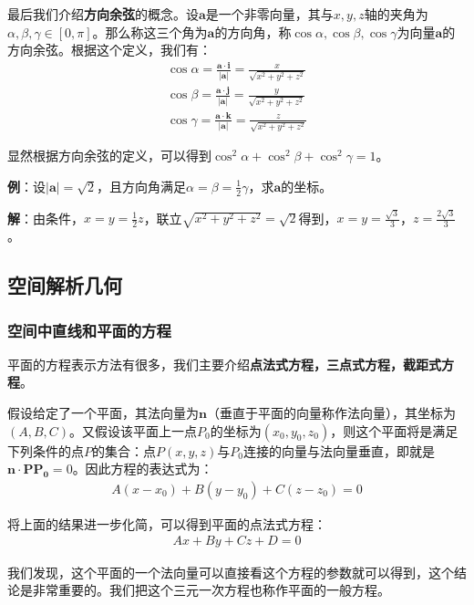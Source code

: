 \documentclass{ctexart}
\let\oldtextbf\textbf %
\renewcommand{\textbf}[1]{\textcolor{btex}{\oldtextbf{#1}}} %
\begin{document}
最后我们介绍\textbf{方向余弦}的概念。设$\bm{a}$是一个非零向量，其与$x,y,z$轴的夹角为$\alpha,\beta,\gamma\in[0,\pi]$。那么称这三个角为$\bm{a}$的方向角，称$\cos\alpha,\cos\beta,\cos\gamma$为向量$\bm{a}$的方向余弦。根据这个定义，我们有：
\begin{align*}
    \cos\alpha=\frac{\bm{a}\cdot\bm{i}}{|\bm{a}|}=\frac{x}{\sqrt{x^2+y^2+z^2}}\\
\cos\beta=\frac{\bm{a}\cdot\bm{j}}{|\bm{a}|}=\frac{y}{\sqrt{x^2+y^2+z^2}}\\
\cos\gamma=\frac{\bm{a}\cdot\bm{k}}{|\bm{a}|}=\frac{z}{\sqrt{x^2+y^2+z^2}}\tag{6-7} 
\end{align*}

显然根据方向余弦的定义，可以得到$\cos^2\alpha+\cos^2\beta+\cos^2\gamma=1$。

\textbf{例}：设$|\bm{a}|=\sqrt{2}$，且方向角满足$\alpha=\beta=\frac{1}{2}\gamma$，求$\bm{a}$的坐标。

\textbf{解}：由条件，$x=y=\frac{1}{2}z$，联立$\sqrt{x^2+y^2+z^2}=\sqrt{2}$得到，$x=y=\frac{\sqrt{3}}{3}$，$z=\frac{2\sqrt{3}}{3}$。

\subsection{空间解析几何}
\subsubsection{空间中直线和平面的方程}
平面的方程表示方法有很多，我们主要介绍\textbf{点法式方程，三点式方程，截距式方程}。

假设给定了一个平面，其法向量为$\bm{n}$（垂直于平面的向量称作法向量），其坐标为$(A,B,C)$。又假设该平面上一点$P_0$的坐标为$(x_0,y_0,z_0)$，则这个平面将是满足下列条件的点$P$的集合：点$P(x,y,z)$与$P_0$连接的向量与法向量垂直，即就是$\bm{n}\cdot\bm{PP_0}=0$。因此方程的表达式为：
\begin{align*}
    A(x-x_0)+B(y-y_0)+C(z-z_0)=0
\end{align*}
\begin{tcolorbox}[
    colback=bac1,     %
    colframe=fra1,   %
    coltitle=white,             %
    coltext=tex1,
    title=平面的点法式方程,
    fonttitle=\bfseries,        %
arc=3mm,                     %
breakable
]
将上面的结果进一步化简，可以得到平面的点法式方程：
\begin{align*}
    Ax+By+Cz+D=0\tag{6-8}
\end{align*}

我们发现，这个平面的一个法向量可以直接看这个方程的参数就可以得到，这个结论是非常重要的。我们把这个三元一次方程也称作平面的一般方程。
\end{tcolorbox}
\end{document}
